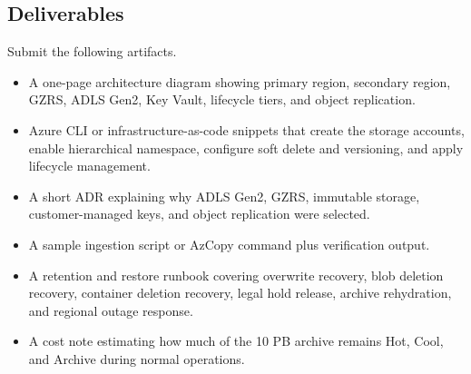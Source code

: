 \subsection*{Deliverables}
Submit the following artifacts.
\begin{itemize}
    \item A one-page architecture diagram showing primary region, secondary region, GZRS, ADLS Gen2, Key Vault, lifecycle tiers, and object replication.
    \item Azure CLI or infrastructure-as-code snippets that create the storage accounts, enable hierarchical namespace, configure soft delete and versioning, and apply lifecycle management.
    \item A short ADR explaining why ADLS Gen2, GZRS, immutable storage, customer-managed keys, and object replication were selected.
    \item A sample ingestion script or AzCopy command plus verification output.
    \item A retention and restore runbook covering overwrite recovery, blob deletion recovery, container deletion recovery, legal hold release, archive rehydration, and regional outage response.
    \item A cost note estimating how much of the 10 PB archive remains Hot, Cool, and Archive during normal operations.
\end{itemize}


